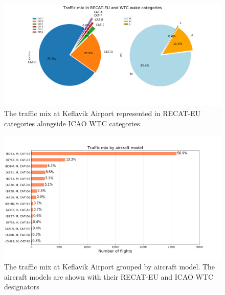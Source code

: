 \\
\\
\\
\\


\begin{figure}[ht]
    \centering
    \includegraphics[width=1\textwidth]{graphics/fig_post_fast_exit_mix_pie_v2.png}
    \caption[Traffic mix in RECAT-EU and ICAO WTC]{The traffic mix at Keflavik Airport represented in RECAT-EU categories alongside ICAO WTC categories.}
    \label{fig:post_fast_exit_mix_pie_v2}
\end{figure}


\begin{figure}
    \centering
    \includegraphics[width=1\textwidth]{graphics/fig_traffic_mix_by_model.png}
    \caption[Traffic mix by aircraft model.]{The traffic mix at Keflavik Airport grouped by aircraft model. The aircraft models are shown with their RECAT-EU and ICAO WTC designators}
    \label{fig:traffic_mix_by_model}
\end{figure}

